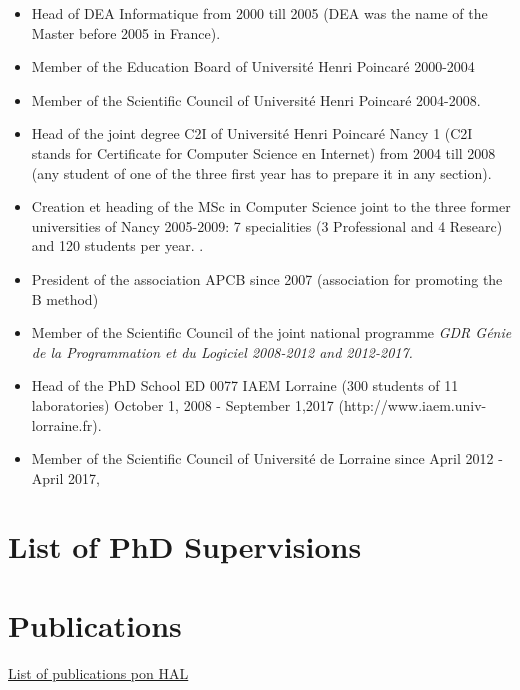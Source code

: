 \documentclass[ 12pt]{article}
\begin{document}
\begin{itemize}
  


\item Head of  DEA Informatique from  2000 till 2005 (DEA  was the name of the Master before 2005 in France).

\item Member of the Education Board of Universit\'e Henri Poincar\'e 2000-2004

\item Member of the Scientific Council of Universit\'e Henri Poincar\'e 2004-2008.


\item Head of  the joint degree  C2I of Universit\'e Henri Poincar\'e Nancy 1 (C2I stands  for Certificate for Computer Science en Internet)  from 2004 till 2008 (any student of one of the three first year has to prepare it in any  section). 

\item Creation et heading of the MSc in Computer Science joint to the three former  universities of Nancy  2005-2009: 7 specialities  (3 Professional  and 4 Researc) and  120 
students per year.
.

\item President of the association APCB since 2007 (association for promoting the B method)



\item  Member of the Scientific Council of the joint  national programme  \textit{GDR G\'enie de la Programmation et du Logiciel 2008-2012 and 2012-2017.}

\item Head of the PhD School ED 0077   IAEM Lorraine  (300 students of 11 laboratories)  October 1, 2008 - September 1,2017  (http://www.iaem.univ-lorraine.fr).

\item Member of the Scientific Council of Universit\'e de Lorraine  since  April  2012 - April 2017,

\end{itemize}



\section{List of PhD Supervisions}
\label{sec:list-phd-superv}



\section{Publications }
\label{sec:publications-}



 \href{https://haltools.inria.fr/Public/afficheRequetePubli.php?auteur_exp=dominique%2Cmery&annee_publideb=1980&annee_publifin=2024&CB_auteur=oui&CB_titre=oui&CB_article=oui&langue=Anglais&tri_exp=annee_publi&tri_exp2=typdoc&tri_exp3=date_publi&ordre_aff=TA&Fen=Aff&css=../css/VisuRubriqueEncadre.css}{List
   of publications pon HAL}

 
%
%



\end{document}
